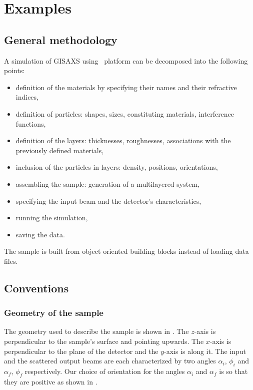 \chapter{Examples}  \label{ExamplesChapter}

\section{General methodology}
A simulation of GISAXS using \BornAgain\ platform can be decomposed into the following points:
\begin{itemize}
\item definition of the materials by specifying their names and their
  refractive indices,
\item definition of particles: shapes, sizes, constituting materials, interference functions,
\item definition of the layers: thicknesses, roughnesses, associations with the previously defined
materials,
\item inclusion of the particles in layers: density, positions, orientations, 
\item assembling the sample: generation of a multilayered system,
\item specifying the input beam and the detector's
  characteristics,
\item running the simulation,
\item saving the data.
\end{itemize}

\noindent The sample is built from object oriented building blocks instead of loading data files.

\section{Conventions}

\subsection{Geometry of the sample}

\noindent The geometry used to describe the sample is shown in . The $z$-axis is perpendicular to the sample's
surface and pointing upwards. The $x$-axis  is perpendicular to the
plane of the detector and the $y$-axis is along it. The input and the
scattered output beams are each characterized by two angles
$\alpha_i$, $\phi_i$ and $\alpha_f$, $\phi_f$ respectively. Our choice of orientation for the
angles $\alpha_i$ and $\alpha_f$ is so that they are positive as shown in . \\


